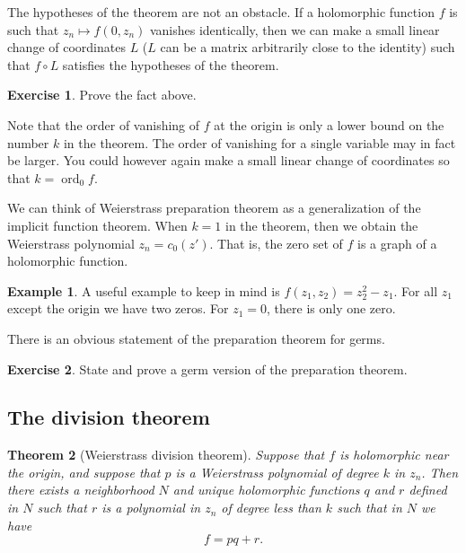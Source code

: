 \documentclass[12pt,openany]{book}
\newcommand{\ord}{\operatorname{ord}}
\newcommand{\myindex}[1]{#1\index{#1}}
\theoremstyle{plain}
\newtheorem{thm}{Theorem}[section]
\theoremstyle{remark}
\theoremstyle{definition}
\theoremstyle{exercise}
\newtheorem{exercise}{Exercise}[section]
\theoremstyle{example}
\newtheorem{example}[thm]{Example}
\begin{document}
The hypotheses of the theorem are not an obstacle.  If a holomorphic
function $f$ is such that $z_n \mapsto f(0,z_n)$ vanishes identically,
then we can make a small linear change of
coordinates $L$ ($L$ can be a matrix arbitrarily close to the identity) such
that $f \circ L$ satisfies the hypotheses of the theorem.

\begin{exercise}
Prove the fact above.
\end{exercise}

Note that the order of vanishing of $f$ at the origin is only a lower bound
on the number $k$ in the theorem.  The order of vanishing for a single
variable may in fact be larger.  You could however again make a small linear
change of coordinates so that $k = \ord_0 f$.

We can think of Weierstrass preparation theorem as a generalization of
the implicit function theorem.  When $k=1$ in the theorem, then we obtain
the Weierstrass polynomial $z_n = c_0(z')$.  That is, the zero set of 
$f$ is a graph of a holomorphic function.

\begin{example}
A useful example to keep in mind is $f(z_1,z_2) = z_2^2 - z_1$.  For
all $z_1$ except the origin we have two zeros.  For $z_1 = 0$, there
is only one zero.
\end{example}

There is an obvious statement of the preparation theorem for germs.

\begin{exercise}
State and prove a germ version of the preparation theorem.
\end{exercise}

\subsection{The division theorem}


\begin{thm}[\myindex{Weierstrass division theorem}]
Suppose that $f$ is holomorphic near the origin, and suppose that $p$
is a Weierstrass polynomial of degree $k$ in $z_n$.  Then there exists
a neighborhood $N$ and unique holomorphic functions $q$ and $r$
defined in $N$ such that $r$ is a polynomial in $z_n$ of degree less than $k$
such that in $N$ we have
\begin{equation*}
f = pq + r .
\end{equation*}
\end{thm}
\end{document}
